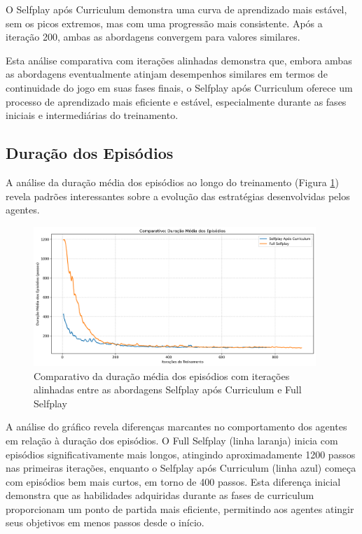 O Selfplay após Curriculum demonstra uma curva de aprendizado mais estável, sem os picos extremos, mas com uma progressão mais consistente. Após a iteração 200, ambas as abordagens convergem para valores similares.

Esta análise comparativa com iterações alinhadas demonstra que, embora ambas as abordagens eventualmente atinjam desempenhos similares em termos de continuidade do jogo em suas fases finais, o Selfplay após Curriculum oferece um processo de aprendizado mais eficiente e estável, especialmente durante as fases iniciais e intermediárias do treinamento.

\subsection{Duração dos Episódios}

A análise da duração média dos episódios ao longo do treinamento (Figura \ref{fig:episode_len}) revela padrões interessantes sobre a evolução das estratégias desenvolvidas pelos agentes.

\begin{figure}[H]
    \centering
    \includegraphics[width=0.95\textwidth]{fig/graficos_trabalho/graficos_experimentos/geral/comparativo_duracao_episodios.png}
    \caption{Comparativo da duração média dos episódios com iterações alinhadas entre as abordagens Selfplay após Curriculum e Full Selfplay}
    \label{fig:episode_len}
\end{figure}

A análise do gráfico revela diferenças marcantes no comportamento dos agentes em relação à duração dos episódios. O Full Selfplay (linha laranja) inicia com episódios significativamente mais longos, atingindo aproximadamente 1200 passos nas primeiras iterações, enquanto o Selfplay após Curriculum (linha azul) começa com episódios bem mais curtos, em torno de 400 passos. Esta diferença inicial demonstra que as habilidades adquiridas durante as fases de curriculum proporcionam um ponto de partida mais eficiente, permitindo aos agentes atingir seus objetivos em menos passos desde o início.

